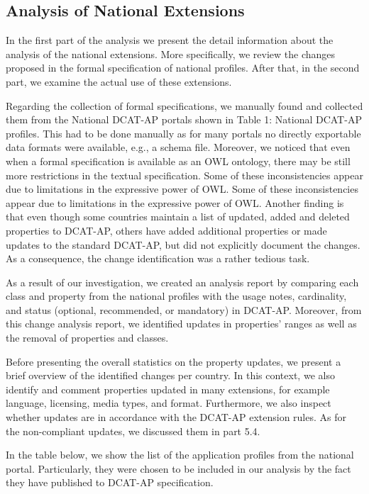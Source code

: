 \documentclass[<options>]{elsarticle}
\begin{document}
\subsection{Analysis of National Extensions}
In the first part of the analysis we present the detail information about the analysis of the national extensions. More specifically, we review the changes proposed in the formal specification of national profiles. After that, in the second part, we examine the actual use of these extensions.

Regarding the collection of formal specifications, we manually found and collected them from the National DCAT-AP portals shown in Table 1: National DCAT-AP profiles. This had to be done manually as for many portals no directly exportable data formats were available, e.g., a schema file. Moreover, we noticed that even when a formal specification is available as an OWL ontology, there may be still more restrictions in the textual specification. Some of these inconsistencies appear due to limitations in the expressive power of OWL. Some of these inconsistencies appear due to limitations in the expressive power of OWL. Another finding is that even though some countries maintain a list of updated, added and deleted properties to DCAT-AP, others have added additional properties or made updates to the standard DCAT-AP, but did not explicitly document the changes. As a consequence, the change identification was a rather tedious task. 

As a result of our investigation, we created an analysis report by comparing each class and property from the national profiles with the usage notes, cardinality, and status (optional, recommended, or mandatory) in DCAT-AP. Moreover, from this change analysis report, we identified updates in properties’ ranges as well as the removal of properties and classes.

Before presenting the overall statistics on the property updates, we present a brief overview of the identified changes per country. In this context, we also identify and comment properties updated in many extensions, for example language, licensing, media types, and format. Furthermore, we also inspect whether updates are in accordance with the DCAT-AP extension rules. As for the non-compliant updates, we discussed them in part 5.4.

In the table below, we show the list of the application profiles from the national portal. Particularly, they were chosen to be included in our analysis by the fact they have published to DCAT-AP specification. 
\\
\\
\\
\end{document}
